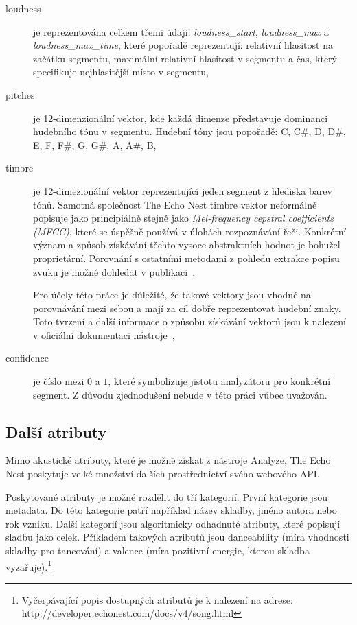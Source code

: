 \documentclass[thesis=M,czech]{FITthesis}[2012/06/26]
\begin{document}
\begin{description}
\item[loudness]

je reprezentována celkem třemi údaji: \textit{loudness\_start}, \textit{loudness\_max} a \textit{loudness\_max\_time}, které popořadě reprezentují: relativní hlasitost na začátku segmentu, maximální relativní hlasitost v segmentu a čas, který specifikuje nejhlasitější místo v segmentu,
 
\item[pitches] je 12-dimenzionální vektor, kde každá dimenze představuje dominanci hudebního tónu v segmentu. Hudební tóny jsou popořadě: C, C\#, D, D\#, E, F, F\#, G, G\#, A, A\#, B,

\item[timbre] je 12-dimezionální vektor reprezentující jeden segment z hlediska barev tónů. Samotná společnost The Echo Nest timbre vektor neformálně popisuje jako principiálně stejně jako \textit{Mel-frequency cepstral coefficients (MFCC)}, které se úspěšně používá v úlohách rozpoznávání řeči. Konkrétní význam a způsob získávání těchto vysoce abstraktních hodnot je bohužel proprietární. Porovnání s ostatními metodami z pohledu extrakce popisu zvuku je možné dohledat v publikaci~\cite{adaptivemultim}.

Pro účely této práce je důležité, že takové vektory jsou vhodné na porovnávání mezi sebou a mají za cíl dobře reprezentovat hudební znaky. Toto tvrzení a další informace o způsobu získávání vektorů jsou k nalezení v oficiální dokumentaci nástroje~\cite{analyze},

\item[confidence] je číslo mezi $0$ a $1$, které symbolizuje jistotu analyzátoru pro konkrétní segment. Z důvodu zjednodušení nebude v této práci vůbec uvažován.
\end{description}

\subsection{Další atributy}
Mimo akustické atributy, které je možné získat z nástroje Analyze, The Echo Nest poskytuje velké množství dalších prostřednictví svého webového API.

Poskytované atributy je možné rozdělit do tří kategorií. První kategorie jsou metadata. Do této kategorie patří například název skladby, jméno autora nebo rok vzniku. 
Další kategorií jsou algoritmicky odhadnuté atributy, které popisují sladbu jako celek. Příkladem takových atributů jsou danceability (míra vhodnosti skladby pro tancování) a valence (míra pozitivní energie, kterou skladba vyzařuje).\footnote{Vyčerpávající popis dostupných atributů je k nalezení na adrese: http://developer.echonest.com/docs/v4/song.html}
\end{document}
